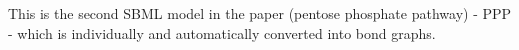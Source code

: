 This is the second SBML model in the paper (pentose phosphate pathway) - PPP - which is individually and automatically converted into bond graphs.
